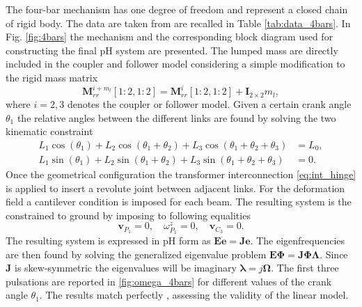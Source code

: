 \documentclass{svjour3}                     %
\begin{document}
The four-bar mechanism has one degree of freedom and represent a closed chain of rigid body. The data are taken from \cite{KITIS1990267,Chebbi2017} are recalled in Table \ref{tab:data_4bars}. In Fig. \ref{fig:4bars} the mechanism and the corresponding block diagram used for constructing the final pH system are presented. The lumped mass are directly included in the coupler and follower model considering a simple modification to the rigid mass matrix
\begin{equation}
 \bm{M}_{rr}^{i + m_l}[1:2,1:2] = \bm{M}_{rr}^{i}[1:2,1:2] + \bm{I}_{2\times 2} m_l,
\end{equation} 
where $i=2,3$ denotes the coupler or follower model. Given a certain crank angle $\theta_1$ the relative angles between the different links are found by solving the two kinematic constraint
\begin{align*}
L_1 \cos(\theta_1)+ L_2 \cos(\theta_1+\theta_2)+ L_3 \cos(\theta_1+\theta_2+\theta_3) &=L_0, \\
L_1 \sin(\theta_1)+L_2 \sin(\theta_1+\theta_2)+L_3 \sin(\theta_1+\theta_2+\theta_3) &=0.
\end{align*} 
Once the geometrical configuration the transformer interconnection \eqref{eq:int_hinge} is applied to insert a revolute joint between adjacent links. For the deformation field a cantilever condition is imposed for each beam. The resulting system is the constrained to ground by imposing to following equalities
\begin{equation*}
\bm{v}_{P_1} = 0, \quad \omega^z_{P_1} = 0, \quad \bm{v}_{C_3} = 0.
\end{equation*}
The resulting system is expressed in pH form as $\bm{E}\dot{\bm{e}} = \bm{J} \bm{e}$. The eigenfrequencies are then found by solving the generalized eigenvalue problem $\bm{E}\bm{\Phi} = \bm{J} \bm{\Phi \Lambda}$. Since $\bm{J}$ is skew-symmetric the eigenvalues will be imaginary $\bm{\lambda} = j \bm{\Omega}$. The first three pulsations  are reported in \ref{fig:omega_4bars} for different values of the crank angle $\theta_1$. The results match perfectly \cite{KITIS1990267,Chebbi2017}, assessing the validity of the linear model.
\end{document}
